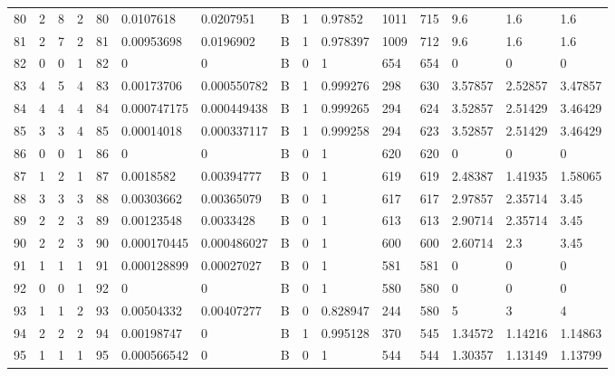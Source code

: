 \begin{latin}
\begin{longtable}{lllllllllllllll}
	80  & 2  & 8   & 2  & 80  & 0.0107618      & 0.0207951      & B & 1  & 0.97852  & 1011 & 715  & 9.6     & 1.6     & 1.6     \\
	81  & 2  & 7   & 2  & 81  & 0.00953698     & 0.0196902      & B & 1  & 0.978397 & 1009 & 712  & 9.6     & 1.6     & 1.6     \\
	82  & 0  & 0   & 1  & 82  & 0              & 0              & B & 0  & 1        & 654  & 654  & 0       & 0       & 0       \\
	83  & 4  & 5   & 4  & 83  & 0.00173706     & 0.000550782    & B & 1  & 0.999276 & 298  & 630  & 3.57857 & 2.52857 & 3.47857 \\
	84  & 4  & 4   & 4  & 84  & 0.000747175    & 0.000449438    & B & 1  & 0.999265 & 294  & 624  & 3.52857 & 2.51429 & 3.46429 \\
	85  & 3  & 3   & 4  & 85  & 0.00014018     & 0.000337117    & B & 1  & 0.999258 & 294  & 623  & 3.52857 & 2.51429 & 3.46429 \\
	86  & 0  & 0   & 1  & 86  & 0              & 0              & B & 0  & 1        & 620  & 620  & 0       & 0       & 0       \\
	87  & 1  & 2   & 1  & 87  & 0.0018582      & 0.00394777     & B & 0  & 1        & 619  & 619  & 2.48387 & 1.41935 & 1.58065 \\
	88  & 3  & 3   & 3  & 88  & 0.00303662     & 0.00365079     & B & 0  & 1        & 617  & 617  & 2.97857 & 2.35714 & 3.45    \\
	89  & 2  & 2   & 3  & 89  & 0.00123548     & 0.0033428      & B & 0  & 1        & 613  & 613  & 2.90714 & 2.35714 & 3.45    \\
	90  & 2  & 2   & 3  & 90  & 0.000170445    & 0.000486027    & B & 0  & 1        & 600  & 600  & 2.60714 & 2.3     & 3.45    \\
	91  & 1  & 1   & 1  & 91  & 0.000128899    & 0.00027027     & B & 0  & 1        & 581  & 581  & 0       & 0       & 0       \\
	92  & 0  & 0   & 1  & 92  & 0              & 0              & B & 0  & 1        & 580  & 580  & 0       & 0       & 0       \\
	93  & 1  & 1   & 2  & 93  & 0.00504332     & 0.00407277     & B & 0  & 0.828947 & 244  & 580  & 5       & 3       & 4       \\
	94  & 2  & 2   & 2  & 94  & 0.00198747     & 0              & B & 1  & 0.995128 & 370  & 545  & 1.34572 & 1.14216 & 1.14863 \\
	95  & 1  & 1   & 1  & 95  & 0.000566542    & 0              & B & 0  & 1        & 544  & 544  & 1.30357 & 1.13149 & 1.13799 \\

\end{longtable}
\end{latin}
